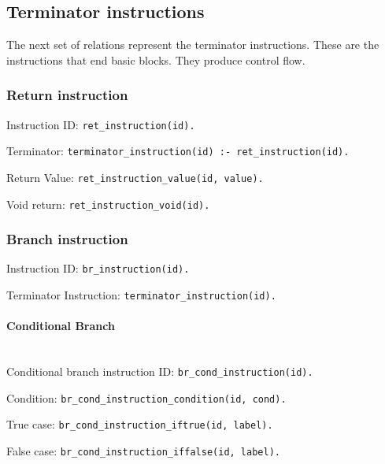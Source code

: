 \subsection{Terminator instructions}
The next set of relations represent the terminator instructions.
These are the instructions that end basic blocks.
They produce control flow.

\subsubsection{Return instruction}
Instruction ID:
\texttt{ret\_instruction(id).}

\noindent Terminator:
\texttt{terminator\_instruction(id) :- ret\_instruction(id).}

\noindent Return Value:
\texttt{ret\_instruction\_value(id, value).}

\noindent Void return:
\texttt{ret\_instruction\_void(id).}


\subsubsection{Branch instruction}
Instruction ID:
\texttt{br\_instruction(id).}

\noindent Terminator Instruction:
\texttt{terminator\_instruction(id).}

\paragraph{Conditional Branch}
~\\Conditional branch instruction ID:
\texttt{br\_cond\_instruction(id).}

\noindent Condition:
\texttt{br\_cond\_instruction\_condition(id, cond).}

\noindent True case:
\texttt{br\_cond\_instruction\_iftrue(id, label).}

\noindent False case:
\texttt{br\_cond\_instruction\_iffalse(id, label).}

